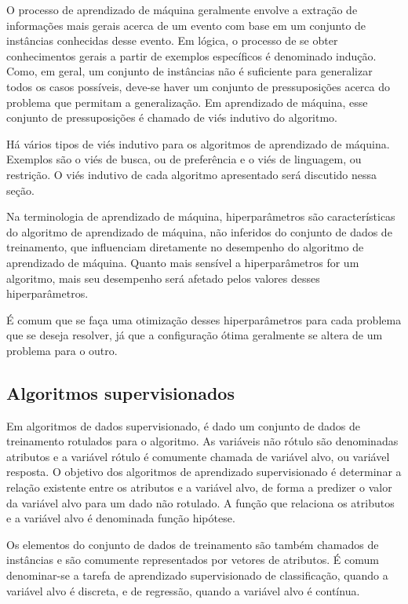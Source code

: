 \documentclass{article}
\begin{document}
O processo de aprendizado de máquina geralmente envolve a extração de informações mais gerais acerca de um evento com base em um conjunto de instâncias conhecidas desse evento.
Em lógica, o processo de se obter conhecimentos gerais a partir de exemplos específicos é denominado indução.
Como, em geral, um conjunto de instâncias não é suficiente para generalizar todos os casos possíveis,
deve-se haver um conjunto de pressuposições acerca do problema que permitam a generalização.
Em aprendizado de máquina, esse conjunto de pressuposições é chamado de viés indutivo do algoritmo.

Há vários tipos de viés indutivo para os algoritmos de aprendizado de máquina.
Exemplos são o viés de busca, ou de preferência e o viés de linguagem, ou restrição.
O viés indutivo de cada algoritmo apresentado será discutido nessa seção.

Na terminologia de aprendizado de máquina, hiperparâmetros são características do algoritmo de aprendizado de máquina,
não inferidos do conjunto de dados de treinamento, que influenciam diretamente no desempenho do algoritmo de aprendizado de máquina.
Quanto mais sensível a hiperparâmetros for um algoritmo, mais seu desempenho será afetado pelos valores desses hiperparâmetros.

É comum que se faça uma otimização desses hiperparâmetros para cada problema que se deseja resolver,
já que a configuração ótima geralmente se altera de um problema para o outro.

\subsection{Algoritmos supervisionados}

Em algoritmos de dados supervisionado, é dado um conjunto de dados de treinamento rotulados para o algoritmo.
As variáveis não rótulo são denominadas atributos e a variável rótulo é comumente chamada de variável alvo, ou variável resposta.
O objetivo dos algoritmos de aprendizado supervisionado é determinar a relação existente entre os atributos e a variável alvo,
de forma a predizer o valor da variável alvo para um dado não rotulado.
A função que relaciona os atributos e a variável alvo é denominada função hipótese.

Os elementos do conjunto de dados de treinamento são também chamados de instâncias e são comumente representados por vetores de atributos.
É comum denominar-se a tarefa de aprendizado supervisionado de classificação, quando a variável alvo é discreta, e de regressão, quando a variável alvo é contínua.
\end{document}
